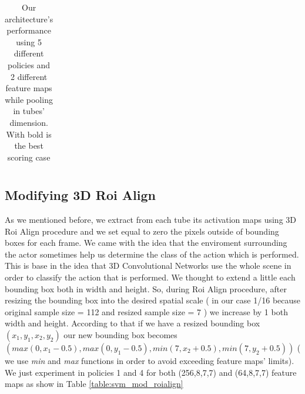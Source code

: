 \documentclass{report}
\begin{document}
\begin{center}
\begin{longtable}{||c | c | c| c||c c c||}
  \caption{Our architecture's performance using 5 different policies and 2 different feature maps while pooling in
  tubes' dimension. With bold is the best scoring case}
  \label{table:svm_first_results}

\end{longtable} 
\end{center}

\subsection{Modifying 3D Roi Align}
As we mentioned before, we extract from each tube its activation maps using 3D Roi Align procedure and we set equal to zero the pixels outside
of bounding boxes for each frame. We came with the idea that the enviroment surrounding the actor sometimes help us determine the class
of the action which is performed. This is base in the idea that 3D Convolutional Networks use the whole scene in order to classify the action
that is performed. We thought to extend a little each bounding box both in width and height. So, during Roi Align procedure, after resizing
the bounding box into the desired spatial scale  ( in our case 1/16 because original sample size = 112 and resized sample size = 7 )
we increase by 1 both width and height. According to that if we have a resized bounding box $( x_1,y_1,x_2,y_2) $ our new bounding box becomes
$ (max(0,x_1-0.5),max(0,y_1-0.5),min(7,x_2+0.5),min(7,y_2+0.5)) $ ( we use \textit{ min} and \textit{max} functions in order to avoid exceeding feature maps' limits).
We just experiment in policies 1 and 4 for both (256,8,7,7) and (64,8,7,7) feature maps as show in  Table \ref{table:svm_mod_roialign}
\end{document}
